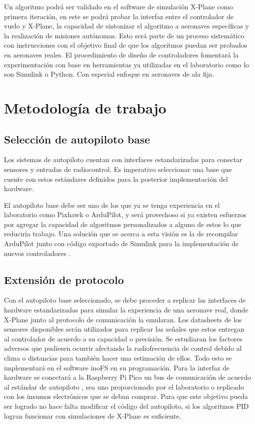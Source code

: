 Un algoritmo podrá ser validado en el software de simulación X-Plane como primera iteración, en este se podrá probar la interfaz entre el controlador de vuelo y X-Plane, la capacidad de sintonizar el algoritmo a aeronaves específicas y la realización de misiones autónomas. Esto será parte de un proceso sistemático con instrucciones con el objetivo final de que los algoritmos puedan ser probados en aeronaves reales. El procedimiento de diseño de controladores fomentará la experimentación con base en herramientas ya utilizadas en el laboratorio como lo son Simulink o Python. Con especial enfoque en aeronaves de ala fija.

\section{Metodología de trabajo}

\subsection{Selección de autopiloto base}

Los sistemas de autopiloto cuentan con interfaces estandarizadas para conectar sensores y entradas de radiocontrol. Es imperativo seleccionar una base que cuente con estos estándares definidos para la posterior implementación del hardware.

El autopiloto base debe ser uno de los que ya se tenga experiencia en el laboratorio como Pixhawk o ArduPilot, y será provechoso si ya existen esfuerzos por agregar la capacidad de algoritmos personalizados a alguno de estos lo que reduciría trabajo. Una solución que se acerca a esta visión es la de recompilar ArduPilot junto con código exportado de Simulink para la implementación de nuevos controladores \cite{ardupilot-custom}.

\subsection{Extensión de protocolo}

Con el autopiloto base seleccionado, se debe proceder a replicar las interfaces de hardware estandarizadas para simular la experiencia de una aeronave real, donde X-Plane junto al protocolo de comunicación la emularan. Los datasheets de los sensores disponibles serán utilizados para replicar las señales que estos entregan al controlador de acuerdo a su capacidad o precisión. Se estudiaran los factores adversos que pudiesen ocurrir afectando la radiofrecuencia de control debido al clima o distancias para también hacer una estimación de ellos. Todo esto se implementará en el software inoFS \cite{inofs} en su programación. Para la interfaz de hardware se conectará a la Raspberry Pi Pico un bus de comunicación de acuerdo al estándar de autopiloto \cite{px4-bus}, sea uno proporcionado por el laboratorio o replicado con los insumos electrónicos que se deban comprar. Para que este objetivo pueda ser logrado no hace falta modificar el código del autopiloto, si los algoritmos PID logran funcionar con simulaciones de X-Plane es suficiente.


